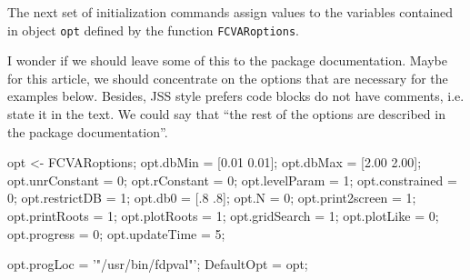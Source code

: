 \documentclass[article]{jss}
\begin{document}
The next set of initialization commands
assign values to the variables contained in object \verb|opt| defined by the function \verb|FCVARoptions|. 

\begin{leftbar} 
I wonder if we should leave some of this to the package documentation. 
Maybe for this article, we should concentrate on the options that are necessary for the examples below. 
Besides, JSS style prefers code blocks do not have comments, i.e. state it in the text. 
We could say that ``the rest of the options are described in the package documentation''. 
\end{leftbar}

\begin{Code}
opt <- FCVARoptions; %
opt.dbMin        = [0.01 0.01]; %
opt.dbMax        = [2.00 2.00]; %
opt.unrConstant  = 0; %
opt.rConstant    = 0; %
opt.levelParam   = 1; %
opt.constrained  = 0; %
opt.restrictDB   = 1; %
opt.db0          = [.8 .8]; %
opt.N            = 0; %
opt.print2screen = 1; %
opt.printRoots   = 1; %
opt.plotRoots    = 1; %
opt.gridSearch   = 1; %
opt.plotLike     = 0; %
opt.progress 	 = 0; %
opt.updateTime   = 5; %

opt.progLoc = '"/usr/bin/fdpval"';  %
DefaultOpt = opt; %
\end{Code}
\end{document}
